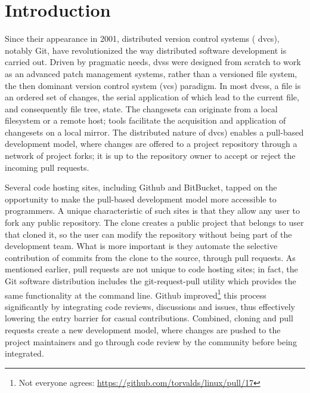\documentclass{sig-alternate}
\begin{document}


\section{Introduction}

Since their appearance in 2001, distributed version control systems ({\sc
dvcs}), notably Git, have revolutionized the way distributed software
development is carried out. Driven by pragmatic needs, {\sc dvs}s were designed
from scratch to work as an advanced patch management systems, rather than a
versioned file system, the then dominant version control system ({\sc vcs})
paradigm. In most {\sc dvcs}s, a file is an ordered set of changes, the serial
application of which lead to the current file, and consequently file tree,
state. The changesets can originate from a local filesystem or a remote host;
tools facilitate the acquisition and application of changesets on a local
mirror. The distributed nature of {\sc dvcs}) enables a pull-based development
model, where changes are offered to a project repository through a network of
project forks; it is up to the repository owner to accept or reject the incoming
pull requests.

Several code hosting sites, including Github and BitBucket, tapped on the
opportunity to make the pull-based development model more accessible to
programmers. A unique characteristic of such sites is that they allow any user
to fork any public repository. The clone creates a public project that belongs
to user that cloned it, so the user can modify the repository without being part
of the development team. What is more important is they automate the selective
contribution of commits from the clone to the source, through pull requests. As
mentioned earlier, pull requests are not unique to code hosting sites; in fact,
the Git software distribution includes the \textsf{git-request-pull} utility
which provides the same functionality at the command line. Github
improved\footnote{Not everyone agrees:
\url{https://github.com/torvalds/linux/pull/17}} this process significantly by
integrating code reviews, discussions and issues, thus effectively lowering the
entry barrier for casual contributions. Combined, cloning and pull requests
create a new development model, where changes are pushed to the project
maintainers and go through code review by the community before being integrated. 
\end{document}
